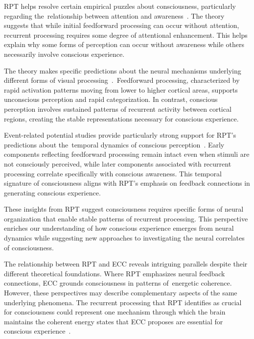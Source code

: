 RPT helps resolve certain empirical puzzles about consciousness, particularly regarding the~relationship between attention and awareness~\cite{Block2007, Webb2016}. The theory suggests that while initial feedforward processing can occur without attention, recurrent processing requires some degree of attentional enhancement. This helps explain why some forms of perception can occur without awareness while others necessarily involve conscious experience.

The theory makes specific predictions about the neural mechanisms underlying different forms of visual processing~\cite{Dehaene2006, Dehaene2021}.~Feedforward processing, characterized by rapid activation patterns moving from lower to higher cortical areas, supports unconscious perception and rapid categorization. In contrast, conscious perception involves sustained patterns of recurrent activity between cortical regions, creating the stable representations necessary for conscious experience.

Event-related potential studies provide particularly strong support for RPT's predictions about the~temporal dynamics of conscious perception~\cite{Koivisto2010, Lamme2000}. Early components reflecting feedforward processing remain intact even when stimuli are not consciously perceived, while later components associated with recurrent processing correlate specifically with conscious awareness. This temporal signature of consciousness aligns with RPT's emphasis on feedback connections in generating conscious experience.

These insights from RPT suggest consciousness requires specific forms of neural organization that enable stable patterns of recurrent processing. This perspective enriches our understanding of how conscious experience emerges from neural dynamics while suggesting new approaches to investigating the neural correlates of consciousness.

The relationship between RPT and ECC reveals intriguing parallels despite their different theoretical foundations. Where RPT emphasizes neural feedback connections, ECC grounds consciousness in patterns of~energetic coherence. However, these perspectives may describe complementary aspects of the same underlying phenomena. The recurrent processing that RPT identifies as crucial for consciousness could represent one mechanism through which the brain maintains the coherent energy states that ECC proposes are essential for conscious experience~\cite{Lamme2006, McFadden2020}.

